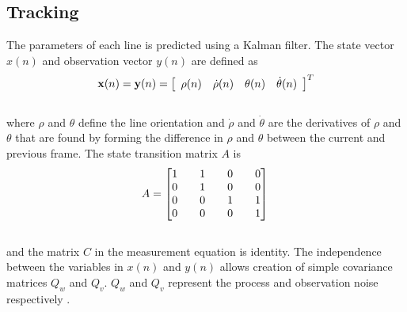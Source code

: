 \documentclass{article}
\begin{document}
\subsection{Tracking}
The parameters of each line is predicted using a Kalman filter.
The state vector $x(n)$ and observation vector $y(n)$ are defined as
\begin{equation}
    {\bf x}(n)= {\bf y}(n)
     = \left[ \begin{array}{cccc}
        \rho (n) & \dot{\rho}(n) & \theta (n) & \dot{\theta}(n)
        \end{array} \right]^T
\label{eq:state_measure_vectors}
\end{equation}\\
where $\rho$ and $\theta$ define the line orientation and $\dot{\rho}$ and $\dot{\theta}$ are the derivatives of $\rho$ and $\theta$ that are found by forming the difference in $\rho $ and $\theta $ between the current and previous frame.
The state transition matrix $A$ is
\begin{equation}
A = \begin{bmatrix} 1 && 1 && 0 && 0 \\ 0 && 1 && 0 && 0 \\ 0 && 0 && 1 && 1 \\ 0 && 0 && 0 && 1 \\\end{bmatrix}\\
\label{eq:state_trans}
\end{equation}\\
and the matrix $C$ in the measurement equation is identity.
The independence between the variables in $x(n)$ and $y(n)$ allows creation of simple covariance matrices $Q_w$ and $Q_v$. $Q_w$ and $Q_v$ represent the process and observation noise respectively \cite{hayes_statistical_1996}.
\end{document}
